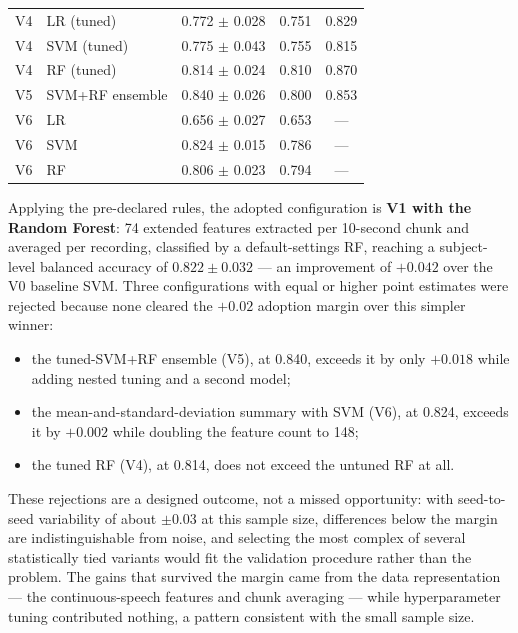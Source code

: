 \begin{table}[htb]
\begin{tabular}{llccc}
\midrule
V4 & LR (tuned)  & 0.772 $\pm$ 0.028 & 0.751 & 0.829 \\
V4 & SVM (tuned) & 0.775 $\pm$ 0.043 & 0.755 & 0.815 \\
V4 & RF (tuned)  & 0.814 $\pm$ 0.024 & 0.810 & 0.870 \\
\midrule
V5 & SVM+RF ensemble & 0.840 $\pm$ 0.026 & 0.800 & 0.853 \\
\midrule
V6 & LR        & 0.656 $\pm$ 0.027 & 0.653 & --- \\
V6 & SVM       & 0.824 $\pm$ 0.015 & 0.786 & --- \\
V6 & RF        & 0.806 $\pm$ 0.023 & 0.794 & --- \\
\bottomrule
\end{tabular}
\end{table}

Applying the pre-declared rules, the adopted configuration is
\textbf{V1 with the Random Forest}: 74 extended features extracted per
10-second chunk and averaged per recording, classified by a
default-settings RF, reaching a subject-level balanced accuracy of
$0.822 \pm 0.032$ --- an improvement of $+0.042$ over the V0 baseline
SVM. Three configurations with equal or higher point estimates were
rejected because none cleared the $+0.02$ adoption margin over this
simpler winner:

\begin{itemize}
  \item the tuned-SVM+RF ensemble (V5), at 0.840, exceeds it by only
        $+0.018$ while adding nested tuning and a second model;
  \item the mean-and-standard-deviation summary with SVM (V6), at
        0.824, exceeds it by $+0.002$ while doubling the feature count
        to 148;
  \item the tuned RF (V4), at 0.814, does not exceed the untuned RF at
        all.
\end{itemize}

These rejections are a designed outcome, not a missed opportunity:
with seed-to-seed variability of about $\pm0.03$ at this sample size,
differences below the margin are indistinguishable from noise, and
selecting the most complex of several statistically tied variants
would fit the validation procedure rather than the problem. The gains
that survived the margin came from the data representation --- the
continuous-speech features and chunk averaging --- while
hyperparameter tuning contributed nothing, a pattern consistent with
the small sample size.

